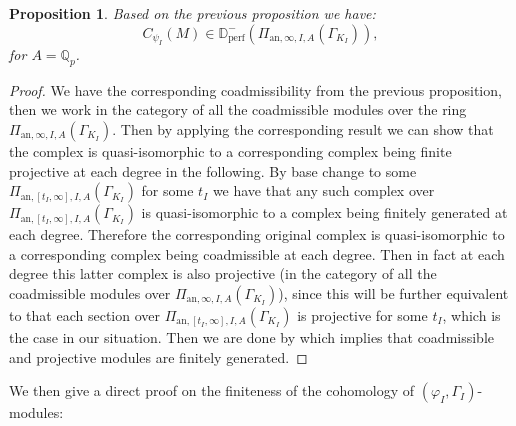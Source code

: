 \documentclass[12pt]{amsart}
\newtheorem{proposition}[theorem]{Proposition}
\theoremstyle{definition}
\numberwithin{equation}{section}
\begin{document}
\begin{proposition}
Based on the previous proposition we have:
\begin{displaymath}
C_{\psi_I}(M)\in  \mathbb{D}^-_\mathrm{perf}(\Pi_{\mathrm{an},\infty,I,A}(\Gamma_{K_I})),	
\end{displaymath}
for $A=\mathbb{Q}_p$.	
\end{proposition}


\begin{proof}
We have the corresponding coadmissibility from the previous proposition, then we work in the category of all the coadmissible modules over the ring $\Pi_{\mathrm{an},\infty,I,A}(\Gamma_{K_I})$. Then by applying the corresponding result \cite[Theorem 3.10]{Zab1} we can show that the complex is quasi-isomorphic to a corresponding complex being finite projective at each degree in the following. By base change to some $\Pi_{\mathrm{an},[t_I,\infty],I,A}(\Gamma_{K_I})$ for some $t_I$ we have that any such complex over $\Pi_{\mathrm{an},[t_I,\infty],I,A}(\Gamma_{K_I})$ is quasi-isomorphic to a complex being finitely generated at each degree. Therefore the corresponding original complex is quasi-isomorphic to a corresponding complex being coadmissible at each degree. Then in fact at each degree this latter complex is also projective (in the category of all the coadmissible modules over $\Pi_{\mathrm{an},\infty,I,A}(\Gamma_{K_I})$), since this will be further equivalent to that each section over $\Pi_{\mathrm{an},[t_I,\infty],I,A}(\Gamma_{K_I})$ is projective for some $t_I$, which is the case in our situation. Then we are done by \cite[Theorem 3.10]{Zab1} which implies that coadmissible and projective modules are finitely generated.



\end{proof}











\indent We then give a direct proof on the finiteness of the cohomology of $(\varphi_I,\Gamma_I)$-modules:
\end{document}
